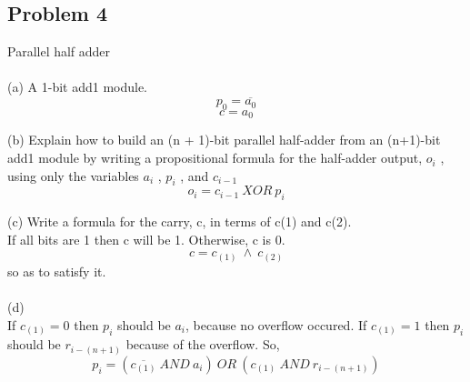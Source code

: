 \documentclass{article}
\begin{document}
\subsection*{Problem 4}
Parallel half adder\\
\\
(a) A 1-bit add1 module.\\
\begin{equation}
    p_0 = \overline{a_0}
\end{equation}
\begin{equation}
    c = a_0
\end{equation}

(b) Explain how to build an (n + 1)-bit parallel half-adder from an (n+1)-bit add1 module by writing a
propositional formula for the half-adder output, $o_i$ , using only the variables $a_i$ , $p_i$ , and $c_{i-1}$\\
\[ o_i = c_{i-1}\ XOR\ p_i \]

(c) Write a formula for the carry, c, in terms of c(1) and c(2).\\
If all bits are 1 then c will be 1. Otherwise, c is 0.
\[c = c_{(1)}\ \land \ c_{(2)}\] so as to satisfy it.\\
\\
(d) \\
If $c_{(1)} = 0$ then $p_i$ should be $a_i$, because no overflow occured.
If $c_{(1)} = 1$ then $p_i$ should be $r_{i-(n+1)}$ because of the overflow.
So,
\[p_i =  (\overline{c_{(1)}}\ AND\ a_i)\ OR\ (c_{(1)}\ AND\ r_{i-(n+1)}) \]
\end{document}
